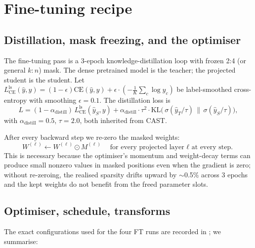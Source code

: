 \documentclass[11pt]{article}
\theoremstyle{plain}
\theoremstyle{definition}
\theoremstyle{remark}
\newcommand{\1}{\mathbf{1}}
\begin{document}
\section{Fine-tuning recipe}
\label{sec:ft-recipe}

\subsection{Distillation, mask freezing, and the optimiser}

The fine-tuning pass is a 3-epoch knowledge-distillation loop with frozen 2:4 (or general $k{:}n$) mask. The dense pretrained model is the teacher; the projected student is the student. Let $L_{\mathrm{CE}}^{\mathrm{ls}}(\hat{y}, y) = (1 - \epsilon) \mathrm{CE}(\hat{y}, y) + \epsilon \cdot (-\frac1K \sum_c \log \hat{y}_c)$ be label-smoothed cross-entropy with smoothing $\epsilon = 0.1$. The distillation loss is
\begin{equation}
\label{eq:distill}
L = (1 - \alpha_{\mathrm{distill}})\, L_{\mathrm{CE}}^{\mathrm{ls}}(\hat{y}_S, y) + \alpha_{\mathrm{distill}} \cdot \tau^2 \cdot \mathrm{KL}\bigl(\,\sigma(\hat{y}_T / \tau)\, \big\|\, \sigma(\hat{y}_S / \tau)\bigr),
\end{equation}
with $\alpha_{\mathrm{distill}} = 0.5$, $\tau = 2.0$, both inherited from CAST.

After every backward step we re-zero the masked weights:
\begin{equation}
\label{eq:mask-freeze}
W^{(\ell)} \leftarrow W^{(\ell)} \odot M^{(\ell)} \quad \text{for every projected layer $\ell$ at every step.}
\end{equation}
This is necessary because the optimiser's momentum and weight-decay terms can produce small nonzero values in masked positions even when the gradient is zero; without re-zeroing, the realised sparsity drifts upward by $\sim$0.5\% across 3 epochs and the kept weights do not benefit from the freed parameter slots.

\subsection{Optimiser, schedule, transforms}
The exact configurations used for the four FT runs are recorded in ; we summarise:
\end{document}
